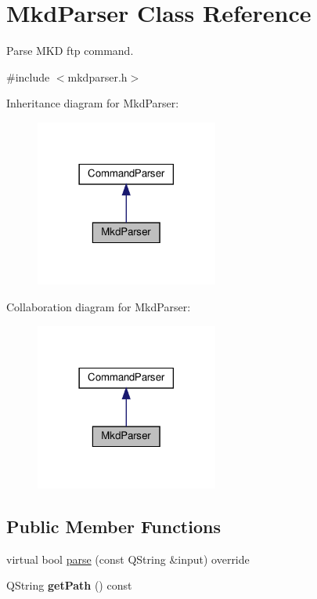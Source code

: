 \hypertarget{classMkdParser}{}\section{Mkd\+Parser Class Reference}
\label{classMkdParser}


Parse M\+KD ftp command.  




{\ttfamily \#include $<$mkdparser.\+h$>$}



Inheritance diagram for Mkd\+Parser\+:\nopagebreak
\begin{figure}[H]
\begin{center}
\leavevmode
\includegraphics[width=170pt]{de/d86/classMkdParser__inherit__graph}
\end{center}
\end{figure}


Collaboration diagram for Mkd\+Parser\+:\nopagebreak
\begin{figure}[H]
\begin{center}
\leavevmode
\includegraphics[width=170pt]{dd/df9/classMkdParser__coll__graph}
\end{center}
\end{figure}
\subsection*{Public Member Functions}
\begin{DoxyCompactItemize}
\item 
virtual bool \hyperlink{classMkdParser_ad886e57eeff70f08b2e057879fb0d9df}{parse} (const Q\+String \&input) override
\item 
\mbox{\label{classMkdParser_ac2e8dfb4319d758c3b8de86b7b59607a}} 
Q\+String {\bfseries get\+Path} () const
\end{DoxyCompactItemize}


